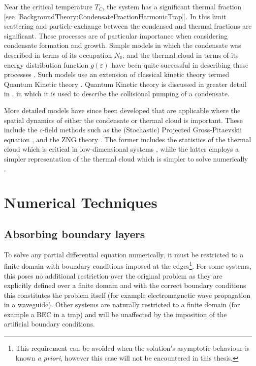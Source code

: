 Near the critical temperature $T_C$, the system has a significant thermal fraction [see \eqref{BackgroundTheory:CondensateFractionHarmonicTrap}].  In this limit scattering and particle-exchange between the condensed and thermal fractions are significant.  These processes are of particular importance when considering condensate formation and growth.  Simple models in which the condensate was described in terms of its occupation $N_0$, and the thermal cloud in terms of its energy distribution function $g(\varepsilon)$ have been quite successful in describing these processes \citep{Davis:2000vn,Bijlsma:2000}.  Such models use an extension of classical kinetic theory termed Quantum Kinetic theory \citep{Gardiner:1997tz,Jaksch:1997ug,Gardiner:1998wx,Jaksch:1998sj,Gardiner:2000ug,Lee:2000vs,Davis:2000vn}.  Quantum Kinetic theory is discussed in greater detail in , in which it is used to describe the collisional pumping of a condensate.

More detailed models have since been developed that are applicable where the spatial dynamics of either the condensate or thermal cloud is important.  These include the $c$-field methods such as the (Stochastic) Projected Gross-Pitaevskii equation \citep{Blakie:2008a}, and the ZNG theory \citep{Zaremba:1999,Proukakis:2008}.  The former includes the statistics of the thermal cloud which is critical in low-dimensional systems \citep{Blakie:2008a}, while the latter employs a simpler representation of the thermal cloud which is simpler to solve numerically \citep{Proukakis:2008}.

\section{Numerical Techniques}
\label{BackgroundTheory:NumericalTechniques}

\subsection{Absorbing boundary layers}
\label{BackgroundTheory:AbsorbingBoundaryLayers}

To solve any partial differential equation numerically, it must be restricted to a finite domain with boundary conditions imposed at the edges\footnote{This requirement can be avoided when the solution's asymptotic behaviour is known \emph{a priori}, however this case will not be encountered in this thesis.}. For some systems, this poses no additional restriction over the original problem as they are explicitly defined over a finite domain and with the correct boundary conditions this constitutes the problem itself (for example electromagnetic wave propagation in a waveguide). Other systems are naturally restricted to a finite domain (for example a BEC in a trap) and will be unaffected by the imposition of the artificial boundary conditions. 

